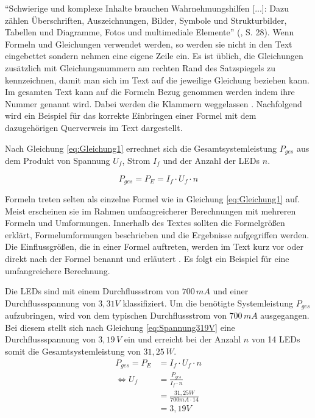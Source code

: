 "`Schwierige und komplexe Inhalte brauchen Wahrnehmungshilfen [...]: Dazu zählen Überschriften, Auszeichnungen, Bilder, Symbole und Strukturbilder, Tabellen und Diagramme, Fotos und multimediale Elemente"' (\cite{Balz2008}, S. 28).
Wenn Formeln und Gleichungen verwendet werden, so werden sie nicht in den Text eingebettet sondern nehmen eine eigene Zeile ein. 
Es ist üblich, die Gleichungen zusätzlich mit Gleichungsnummern am rechten Rand des Satzspiegels zu kennzeichnen, damit man sich im Text auf die jeweilige Gleichung beziehen kann.
Im gesamten Text kann auf die Formeln Bezug genommen werden indem ihre Nummer genannt wird.
Dabei werden die Klammern weggelassen \cite[S.~133~ff.]{Hering2009}.
Nachfolgend wird ein Beispiel für das korrekte Einbringen einer Formel mit dem dazugehörigen Querverweis im Text dargestellt.

Nach Gleichung \ref{eq:Gleichung1} errechnet sich die Gesamtsystemleistung $P_{ges}$ aus dem Produkt von Spannung $U_f$, Strom $I_f$ und der Anzahl der LEDs $n$.

\begin{equation}
P_{ges} = P_E = I_f \cdot U_f \cdot n
\label{eq:Gleichung1}
\end{equation}

\noindent
Formeln treten selten als einzelne Formel wie in Gleichung \ref{eq:Gleichung1} auf.
Meist erscheinen sie im Rahmen umfangreicherer Berechnungen mit mehreren Formeln und Umformungen.
Innerhalb des Textes sollten die Formelgrößen erklärt, Formelumformungen beschrieben und die Ergebnisse aufgegriffen werden.
Die Einflussgrößen, die in einer Formel auftreten, werden im Text kurz vor oder direkt nach der Formel benannt und erläutert \cite[S.~134]{Hering2009}.
Es folgt ein Beispiel für eine umfangreichere Berechnung.

Die LEDs sind mit einem Durchflussstrom von $700\,mA$ und einer Durchflussspannung von $3,31V$ klassifiziert.
Um die benötigte Systemleistung $P_{ges}$ aufzubringen, wird von dem typischen Durchflussstrom von $700\,mA$ ausgegangen.
Bei diesem stellt sich nach Gleichung \ref{eq:Spannung319V} eine Durchflussspannung von $3,19\,V$ ein und erreicht bei der Anzahl $n$ von 14 LEDs somit die Gesamtsystemleistung von $31,25\,W$.
%
\begin{align}
P_{ges} = P_E &= I_f \cdot U_f \cdot n \\
\Leftrightarrow U_f	&= \frac{P_{ges}}{I_f \cdot n}\\
	  &= \frac{31,25W}{700mA \cdot 14}\\
	  &= 3,19V
\label{eq:Spannung319V}
\end{align}

